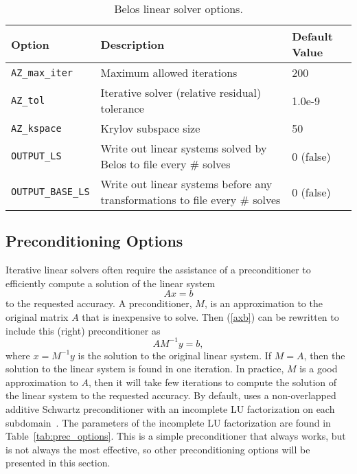 \begin{table}[htp]
\caption[Belos linear solver options.]{Belos linear solver options.}
\label{tab:belos:options}
\begin{center}
\begin{tabular}{| p{3cm} | p{9cm} | p{2.5cm} |}
\hline
Option & Description & Default Value \\
\hline
{\tt AZ\_max\_iter}        & Maximum allowed iterations & 200 \\
{\tt AZ\_tol}              & Iterative solver (relative residual) tolerance & 1.0e-9 \\
{\tt AZ\_kspace}           & Krylov subspace size & 50 \\
{\tt OUTPUT\_LS}           & Write out linear systems solved by Belos to file every \# solves & 0 (false)\\
{\tt OUTPUT\_BASE\_LS}     & Write out linear systems before any transformations to file every \# solves & 0 (false)\\
\hline
\end{tabular}
\end{center}
\end{table}

\subsection{Preconditioning Options}
\label{Preconditioning_Options}

Iterative linear solvers often require the assistance of a preconditioner
to efficiently compute a solution of the linear system
\begin{equation}
\label{axb}
Ax=b
\end{equation}
\noindent to the requested accuracy.  
A preconditioner, $M$, is an approximation to the original matrix $A$ that is inexpensive
to solve.  Then (\ref{axb}) can be rewritten to include this (right) preconditioner as
\begin{equation}
\label{axb:prec}
AM^{-1}y=b,
\end{equation}
\noindent where $x=M^{-1}y$ is the solution to the original linear system.
If $M=A$, then the solution to the linear system is found in one iteration.
In practice, $M$ is a good approximation to $A$, then it will take few iterations
to compute the solution of the linear system to the requested accuracy.
By default, \Xyce{} uses a non-overlapped additive Schwartz preconditioner with 
an incomplete LU factorization on each subdomain~\cite{Saad:2003:IMSLS}.  
The parameters of the incomplete LU factorization are found in Table~\ref{tab:prec_options}.  
This is a simple preconditioner that always works, but is not always the most effective, 
so other preconditioning options will be presented in this section.    

